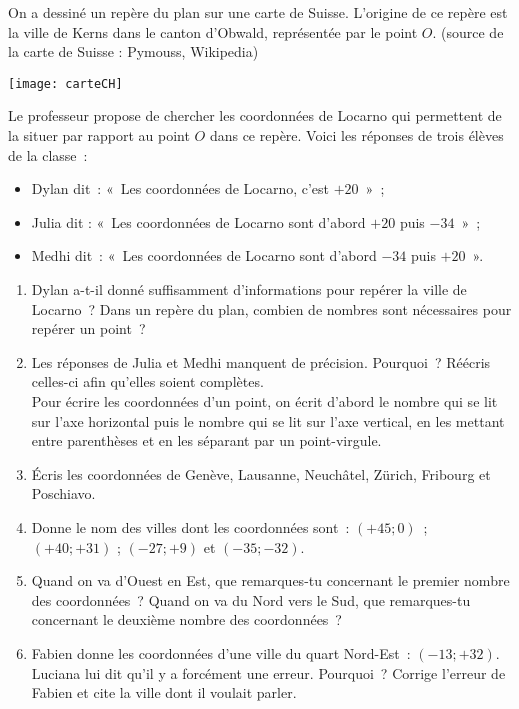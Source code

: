 \begin{activite}

On a dessiné un repère du plan sur une carte de Suisse. L'origine de ce repère est la ville de Kerns dans le canton d'Obwald, représentée par le point $O$. \scriptsize{(source de la carte de Suisse : Pymouss, Wikipedia)}

\begin{center} \texttt{[image: carteCH]} \end{center}
\normalsize{Le professeur propose de chercher les coordonnées de Locarno qui permettent de la situer par rapport au point $O$ dans ce repère. Voici les réponses de trois élèves de la classe :}
\begin{itemize}
 \item Dylan dit : « Les coordonnées de Locarno, c'est $+ 20$ » ;
 \item Julia dit : « Les coordonnées de Locarno sont d'abord $+ 20$ puis $- 34$ » ;
 \item Medhi dit : « Les coordonnées de Locarno sont d'abord $- 34$ puis $+ 20$ ».
 \end{itemize}
 \begin{enumerate}
  \item Dylan a-t-il donné suffisamment d'informations pour repérer la ville de Locarno ? Dans un repère du plan, combien de nombres sont nécessaires pour repérer un point ?
  \item Les réponses de Julia et Medhi manquent de précision. Pourquoi ? Réécris celles-ci afin qu'elles soient complètes. \\[1em]
Pour écrire les coordonnées d'un point, on écrit d'abord le nombre qui se lit sur l'axe horizontal puis le nombre qui se lit sur l'axe vertical, en les mettant entre parenthèses et en les séparant par un point-virgule.
  \item Écris les coordonnées de Genève, Lausanne, Neuchâtel, Zürich, Fribourg et Poschiavo.
  \item Donne le nom des villes dont les coordonnées sont : $(+ 45 ; 0)$ ; $(+ 40 ; + 31)$ ;  $(- 27 ; + 9)$ et $(- 35 ; - 32)$.
  \item Quand on va d'Ouest en Est, que remarques-tu concernant le premier nombre des coordonnées ? Quand on va du Nord vers le Sud, que remarques-tu concernant le deuxième nombre des coordonnées ?
  \item Fabien donne les coordonnées d'une ville du quart Nord-Est : $(- 13 ; + 32)$. Luciana lui dit qu'il y a forcément une erreur. Pourquoi ? Corrige l'erreur de Fabien et cite la ville dont il voulait parler.
  \end{enumerate}
  
\end{activite}

